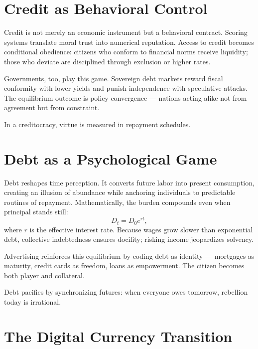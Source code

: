 \documentclass[12pt,twoside]{book}
\begin{document}
\section{Credit as Behavioral Control}

Credit is not merely an economic instrument but a behavioral contract.
Scoring systems translate moral trust into numerical reputation.
Access to credit becomes conditional obedience: citizens who conform to financial norms
receive liquidity; those who deviate are disciplined through exclusion or higher rates.

Governments, too, play this game.
Sovereign debt markets reward fiscal conformity with lower yields and punish independence with speculative attacks.
The equilibrium outcome is policy convergence --- nations acting alike not from agreement but from constraint.\\

\begin{keyidea}
In a creditocracy, virtue is measured in repayment schedules.
\end{keyidea}

\section{Debt as a Psychological Game}

Debt reshapes time perception.
It converts future labor into present consumption, creating an illusion of abundance while
anchoring individuals to predictable routines of repayment.
Mathematically, the burden compounds even when principal stands still:
\[
D_t = D_0 e^{r t},
\]
where $r$ is the effective interest rate.  
Because wages grow slower than exponential debt, collective indebtedness ensures docility;
risking income jeopardizes solvency.

Advertising reinforces this equilibrium by coding debt as identity --- mortgages as maturity,
credit cards as freedom, loans as empowerment.
The citizen becomes both player and collateral.\\

\begin{keyidea}
Debt pacifies by synchronizing futures: when everyone owes tomorrow, rebellion today is irrational.
\end{keyidea}

\section{The Digital Currency Transition}
\end{document}
